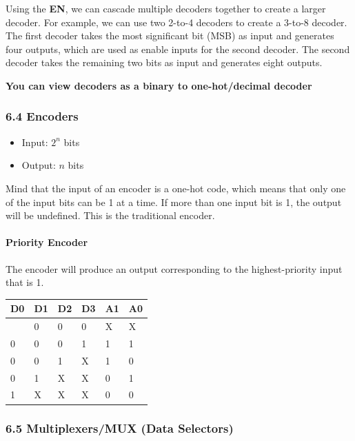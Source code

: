 \documentclass[
  a4paper,
]{article}
\providecommand{\tightlist}{%
  \setlength{\itemsep}{0pt}\setlength{\parskip}{0pt}}
\begin{document}
Using the \textbf{EN}, we can cascade multiple decoders together to
create a larger decoder. For example, we can use two 2-to-4 decoders to
create a 3-to-8 decoder. The first decoder takes the most significant
bit (MSB) as input and generates four outputs, which are used as enable
inputs for the second decoder. The second decoder takes the remaining
two bits as input and generates eight outputs.

\textbf{You can view decoders as a binary to one-hot/decimal decoder}

\subsubsection{6.4 Encoders}\label{encoders}

\begin{itemize}
\tightlist
\item
  Input: \(2^n\) bits
\item
  Output: \(n\) bits
\end{itemize}

Mind that the input of an encoder is a one-hot code, which means that
only one of the input bits can be 1 at a time. If more than one input
bit is 1, the output will be undefined. This is the traditional encoder.

\paragraph{Priority Encoder}\label{priority-encoder}

The encoder will produce an output corresponding to the highest-priority
input that is 1.

\begin{longtable}[]{@{}llllll@{}}
\toprule\noalign{}
D0 & D1 & D2 & D3 & A1 & A0 \\
\midrule\noalign{}
\endhead
\bottomrule\noalign{}
\endlastfoot
0 & 0 & 0 & 0 & X & X \\
0 & 0 & 0 & 1 & 1 & 1 \\
0 & 0 & 1 & X & 1 & 0 \\
0 & 1 & X & X & 0 & 1 \\
1 & X & X & X & 0 & 0 \\
\end{longtable}

\subsubsection{6.5 Multiplexers/MUX (Data
Selectors)}\label{multiplexersmux-data-selectors}
\end{document}
